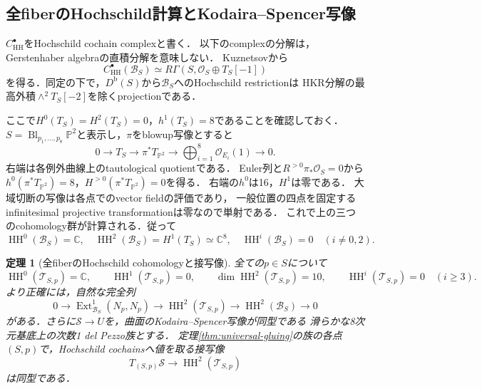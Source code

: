 \documentclass[11pt,a4paper]{ltjsarticle}
\newtheorem{theorem}{定理}[section]
\theoremstyle{definition}
\newcommand{\OO}{\mathcal O}
\newcommand{\BB}{\mathcal B}
\newcommand{\TT}{\mathcal T}
\newcommand{\Db}{D^{\mathrm b}}
\newcommand{\Ext}{\operatorname{Ext}}
\begin{document}
\subsection{全fiberのHochschild計算とKodaira--Spencer写像}

$C^\bullet_{\mathrm{HH}}$をHochschild cochain complexと書く．
以下のcomplexの分解は，Gerstenhaber algebraの直積分解を意味しない．
Kuznetsov\cite[Theorem~8.5とその証明]{Kuznetsov}から
\begin{equation}\label{eq:residual-hochschild}
 C^\bullet_{\mathrm{HH}}(\BB_S)
 \simeq R\Gamma(S,\OO_S\oplus T_S[-1])
\end{equation}
を得る．同定の下で，$\Db(S)$から$\BB_S$へのHochschild restrictionは
HKR分解の最高外積$\wedge^2T_S[-2]$を除くprojectionである．

ここで$H^0(T_S)=H^2(T_S)=0$，$h^1(T_S)=8$であることを確認しておく．
$S=\operatorname{Bl}_{p_1,\ldots,p_8}\mathbb P^2$と表示し，$\pi$をblowup写像とすると
\[
 0\longrightarrow T_S\longrightarrow\pi^*T_{\mathbb P^2}
 \longrightarrow\bigoplus_{i=1}^8\OO_{E_i}(1)\longrightarrow0.
\]
右端は各例外曲線上のtautological quotientである．
Euler列と$R^{>0}\pi_*\OO_S=0$から
$h^0(\pi^*T_{\mathbb P^2})=8$，$H^{>0}(\pi^*T_{\mathbb P^2})=0$を得る．
右端の$h^0$は16，$H^1$は零である．
大域切断の写像は各点でのvector fieldの評価であり，
一般位置の四点を固定するinfinitesimal projective transformationは零なので単射である．
これで上の三つのcohomology群が計算される．従って
\begin{equation}\label{eq:residual-hh-values}
 \operatorname{HH}^0(\BB_S)=\mathbb C,\quad
 \operatorname{HH}^2(\BB_S)=H^1(T_S)\simeq\mathbb C^8,\quad
 \operatorname{HH}^i(\BB_S)=0\quad(i\ne0,2).
\end{equation}

\begin{theorem}[全fiberのHochschild cohomologyと接写像]
\label{thm:gluing-hh-ks}
全ての$p\in S$について
\begin{equation}\label{eq:gluing-hh-values}
 \operatorname{HH}^0(\TT_{S,p})=\mathbb C,\qquad
 \operatorname{HH}^1(\TT_{S,p})=0,\qquad
 \dim\operatorname{HH}^2(\TT_{S,p})=10,\qquad
 \operatorname{HH}^{i}(\TT_{S,p})=0\quad(i\geq3).
\end{equation}
より正確には，自然な完全列
\begin{equation}\label{eq:gluing-hh-extension}
 0\longrightarrow\Ext^1_{\BB_S}(N_p,N_p)
 \longrightarrow\operatorname{HH}^2(\TT_{S,p})
 \longrightarrow\operatorname{HH}^2(\BB_S)\longrightarrow0
\end{equation}
がある．さらに$\mathcal S\to U$を，曲面のKodaira--Spencer写像が同型である
滑らかな8次元基底上の次数1 del Pezzo族とする．
定理\ref{thm:universal-gluing}の族の各点$(S,p)$で，Hochschild cochainsへ値を取る接写像
\begin{equation}\label{eq:universal-KS}
 T_{(S,p)}\mathcal S\longrightarrow\operatorname{HH}^2(\TT_{S,p})
\end{equation}
は同型である．
\end{theorem}
\end{document}
